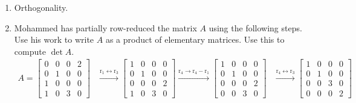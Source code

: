 \documentclass[red]{tutorial}
\theoremstyle{definition}
\theoremstyle{theorem}
\begin{document}
\begin{tutorial}
\begin{enumerate}
    \item
      Orthogonality. %
    \item
      \newcommand{\pmin}{\phantom{-}}
      \newcommand{\row}[1]{\mathrm{r}_{#1}}
      Mohammed has partially row-reduced the matrix $A$ using the
      following steps. Use his work to write $A$ as a product of elementary
      matrices. Use this to compute $\det A$.
      \begin{align*}
        A = \begin{bmatrix}
          0 & 0 & 0 & 2 \\
          0 & 1 & 0 & 0 \\
          1 & 0 & 0 & 0 \\
          1 & 0 & 3 & 0
        \end{bmatrix}&\xrightarrow{\row{1} \leftrightarrow \row{3}}
        \begin{bmatrix}
          1 & 0 & 0 & 0 \\
          0 & 1 & 0 & 0 \\
          0 & 0 & 0 & 2 \\
          1 & 0 & 3 & 0
        \end{bmatrix}
        \xrightarrow{\row{4} \to \row{4}-\row{1}}
        \begin{bmatrix}
          1 & 0 & 0 & 0 \\
          0 & 1 & 0 & 0 \\
          0 & 0 & 0 & 2 \\
          0 & 0 & 3 & 0
        \end{bmatrix}
        &\xrightarrow{\row{4} \leftrightarrow \row{3}}
        \begin{bmatrix}
          1 & 0 & 0 & 0 \\
          0 & 1 & 0 & 0 \\
          0 & 0 & 3 & 0 \\
          0 & 0 & 0 & 2
        \end{bmatrix}&&
      \end{align*}


\end{enumerate}
\end{tutorial}
\end{document}
